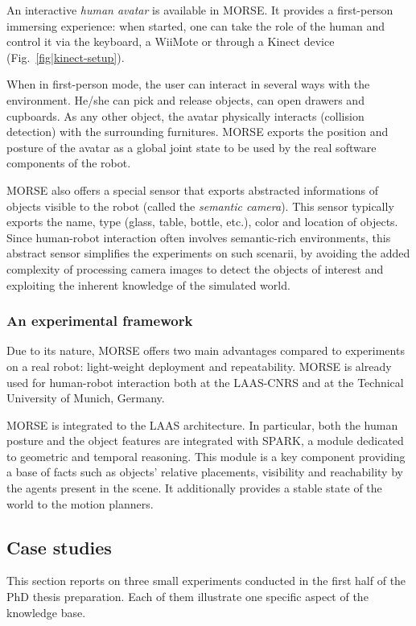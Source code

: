 An interactive \emph{human avatar} is available in MORSE. It provides a
first-person immersing experience: when started, one can take the role of the
human and control it via the keyboard, a WiiMote or through a Kinect device
(Fig.~\ref{fig|kinect-setup}).

When in first-person mode, the user can interact in several ways with the
environment. He/she can pick and release objects, can open drawers and
cupboards. As any other object, the avatar physically interacts (collision
detection) with the surrounding furnitures.  MORSE exports the position
and posture of the avatar as a global joint state to be used by the real
software components of the robot.

MORSE also offers a special sensor that exports abstracted informations of
objects visible to the robot (called the \emph{semantic camera}). This
sensor typically exports the name, type (glass, table, bottle, etc.), color and
location of objects. Since human-robot interaction often involves
semantic-rich environments, this abstract sensor simplifies the
experiments on such scenarii, by avoiding the added complexity of processing
camera images to detect the objects of interest and exploiting the inherent
knowledge of the simulated world.

\subsubsection{An experimental framework}

Due to its nature, MORSE offers two main advantages compared to experiments on
a real robot: light-weight deployment and repeatability. MORSE is already used
for human-robot interaction both at the LAAS-CNRS and at the Technical
University of Munich, Germany.

MORSE is integrated to the LAAS architecture.  In particular, both the human
posture and the object features are integrated with SPARK, a
module dedicated to geometric and temporal reasoning.  This module is a key
component providing a base of facts such as objects' relative placements,
visibility and reachability by the agents present in the scene. It additionally
provides a stable state of the world to the motion planners.

\subsection{Case studies}
\label{sect|casestudies}

This section reports on three small experiments conducted in the first half of
the PhD thesis preparation. Each of them illustrate one specific aspect of the
knowledge base.


